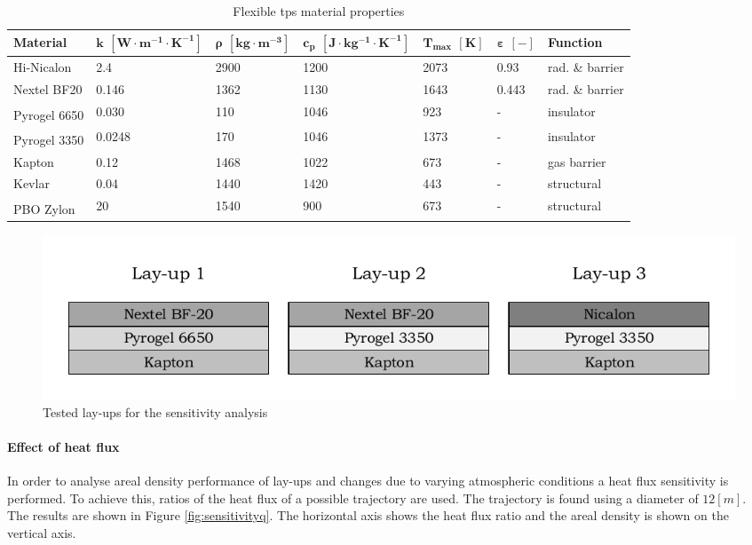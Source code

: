 \begin{table}[ht]
	\caption {Flexible \acrlong{tps} material properties \cite{Corso2009,Corso2011,DuPont2011,Smith2011,Nye,Zinkle1998}}
	\centering
	\begin{tabular}{|l|l|l|l|l|l|l|}
		\hline
		\textbf{Material}         & \textbf{ $\mathbf{k}$ $\mathbf{\left[W \cdot m^{-1} \cdot K^{-1}\right]} $} & \textbf{ $\mathbf{ \rho }$ $\mathbf{ \left[ kg \cdot m^{-3} \right] }$} & \textbf{  $\mathbf{ c_{p} }$ $\mathbf{ \left[ J \cdot kg^{-1} \cdot K^{-1} \right] }$ }& \textbf{ $\mathbf{ T_{max} }$ $\mathbf{ [ K ] }$} &\textbf{ $\mathbf{ \varepsilon }$ $\mathbf{ [ - ] }$} & \textbf{Function} \\[1.6ex]   \hline \hline
		Hi-Nicalon			& 2.4			& 2900	& 1200	& 2073	& 0.93	& rad. \& barrier	\\ \hline
		Nextel BF20			& 0.146			& 1362	& 1130	& 1643	& 0.443	& rad. \& barrier	\\ \hline
		Pyrogel\textsuperscript{\textregistered} 6650		& 0.030			& 110	& 1046	& 923	& -		& insulator			\\ \hline
		Pyrogel\textsuperscript{\textregistered} 3350		& 0.0248		& 170	& 1046	& 1373	& -		& insulator			\\ \hline
		Kapton				& 0.12			& 1468	& 1022	& 673	& -		& gas barrier		\\ \hline
		Kevlar				& 0.04			& 1440	& 1420	& 443	& -		& structural		\\ \hline
		PBO Zylon\textsuperscript{\textregistered}			& 20			& 1540	& 900	& 673	& -		& structural		\\ \hline

	\end{tabular}
	\label{tab:tpsmatprop}
\vspace{-4mm}
\end{table}

\begin{figure}[h]
	\centering
	\includegraphics[width=\textwidth]{./Figure/Thermal/layersensthermal.pdf}
	\caption{Tested lay-ups for the sensitivity analysis}
	\label{fig:layersensthermal}
\end{figure}

\paragraph{Effect of heat flux}
In order to analyse areal density performance of lay-ups and changes due to varying atmospheric conditions a heat flux sensitivity is performed. To achieve this, ratios of the heat flux of a possible trajectory are used. The trajectory is found using a diameter of $12 \left[ m \right]$. The results are shown in Figure \ref{fig:sensitivityq}. The horizontal axis shows the heat flux ratio and the areal density is shown on the vertical axis. 


